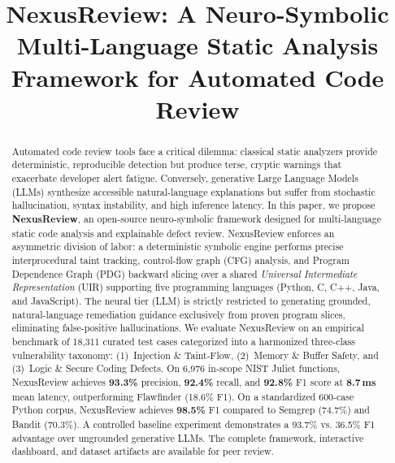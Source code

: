 \documentclass[10pt,conference]{IEEEtran}
\begin{document}
\title{NexusReview: A Neuro-Symbolic Multi-Language Static Analysis Framework for Automated Code Review}

\author{
}

\maketitle

\begin{abstract}
Automated code review tools face a critical dilemma: classical static analyzers provide deterministic, reproducible detection but produce terse, cryptic warnings that exacerbate developer alert fatigue. Conversely, generative Large Language Models (LLMs) synthesize accessible natural-language explanations but suffer from stochastic hallucination, syntax instability, and high inference latency. In this paper, we propose \textbf{NexusReview}, an open-source neuro-symbolic framework designed for multi-language static code analysis and explainable defect review. NexusReview enforces an asymmetric division of labor: a deterministic symbolic engine performs precise interprocedural taint tracking, control-flow graph (CFG) analysis, and Program Dependence Graph (PDG) backward slicing over a shared \emph{Universal Intermediate Representation} (UIR) supporting five programming languages (Python, C, C++, Java, and JavaScript). The neural tier (LLM) is strictly restricted to generating grounded, natural-language remediation guidance exclusively from proven program slices, eliminating false-positive hallucinations. We evaluate NexusReview on an empirical benchmark of 18{,}311 curated test cases categorized into a harmonized three-class vulnerability taxonomy: (1)~Injection \& Taint-Flow, (2)~Memory \& Buffer Safety, and (3)~Logic \& Secure Coding Defects. On 6{,}976 in-scope NIST Juliet functions, NexusReview achieves \textbf{93.3\%} precision, \textbf{92.4\%} recall, and \textbf{92.8\%} F1 score at \textbf{8.7\,ms} mean latency, outperforming Flawfinder (18.6\% F1). On a standardized 600-case Python corpus, NexusReview achieves \textbf{98.5\%} F1 compared to Semgrep (74.7\%) and Bandit (70.3\%). A controlled baseline experiment demonstrates a 93.7\% vs. 36.5\% F1 advantage over ungrounded generative LLMs. The complete framework, interactive dashboard, and dataset artifacts are available for peer review.
\end{abstract}
\end{document}
